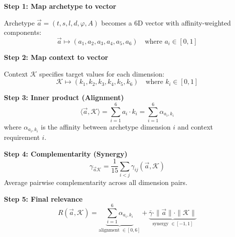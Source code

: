 \begin{tcolorbox}[colback=gray!5!white, colframe=gray!75!black,
    title=Definition HHH-D4: Vector Space Formulation]

\textbf{Step 1: Map archetype to vector}

Archetype $\vec{a} = (t, s, l, d, \varphi, A)$ becomes a 6D vector with affinity-weighted components:
\begin{equation}
\vec{a} \mapsto (a_1, a_2, a_3, a_4, a_5, a_6) \quad \text{where } a_i \in [0, 1]
\end{equation}

\textbf{Step 2: Map context to vector}

Context $\mathcal{K}$ specifies target values for each dimension:
\begin{equation}
\mathcal{K} \mapsto (k_1, k_2, k_3, k_4, k_5, k_6) \quad \text{where } k_i \in [0, 1]
\end{equation}

\textbf{Step 3: Inner product (Alignment)}
\begin{equation}
\langle \vec{a}, \mathcal{K} \rangle = \sum_{i=1}^{6} a_i \cdot k_i = \sum_{i=1}^{6} \alpha_{a_i, k_i}
\end{equation}
where $\alpha_{a_i, k_i}$ is the affinity between archetype dimension $i$ and context requirement $i$.

\textbf{Step 4: Complementarity (Synergy)}
\begin{equation}
\gamma_{\vec{a}\mathcal{K}} = \frac{1}{15} \sum_{i < j} \gamma_{ij}(\vec{a}, \mathcal{K})
\end{equation}
Average pairwise complementarity across all dimension pairs.

\textbf{Step 5: Final relevance}
\begin{equation}
\boxed{R(\vec{a}, \mathcal{K}) = \underbrace{\sum_{i=1}^{6} \alpha_{a_i, k_i}}_{\text{alignment } \in [0, 6]} + \underbrace{\bar{\gamma} \cdot \|\vec{a}\| \cdot \|\mathcal{K}\|}_{\text{synergy } \in [-1, 1]}}
\label{eq:hhh-final-elegant}
\end{equation}

\end{tcolorbox}

